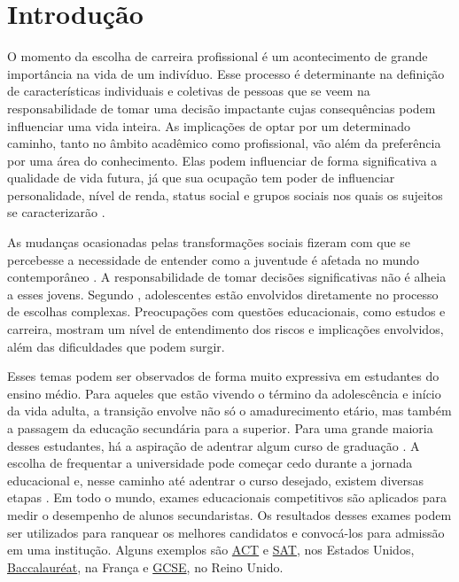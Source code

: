 \chapter{Introdução}

O momento da escolha de carreira profissional é um acontecimento de grande importância na vida de um indivíduo. Esse processo é determinante na definição de características individuais e coletivas de pessoas que se veem na responsabilidade de tomar uma decisão impactante \autocite{AkosahTwumasi2018} cujas consequências podem influenciar uma vida inteira. As implicações de optar por um determinado caminho, tanto no âmbito acadêmico como profissional, vão além da preferência por uma área do conhecimento. Elas podem influenciar de forma significativa a qualidade de vida futura, já que sua ocupação tem poder de influenciar personalidade, nível de renda, status social e grupos sociais nos quais os sujeitos se caracterizarão \autocite{Kazi2017}.

As mudanças ocasionadas pelas transformações sociais fizeram com que se percebesse a necessidade de entender como a juventude é afetada no mundo contemporâneo \autocite{Unesco2006}. A responsabilidade de tomar decisões significativas não é alheia a esses jovens. Segundo \citet{Gati2001}, adolescentes estão envolvidos diretamente no processo de escolhas complexas. Preocupações com questões educacionais, como estudos e carreira, mostram um nível de entendimento dos riscos e implicações envolvidos, além das dificuldades que podem surgir.

Esses temas podem ser observados de forma muito expressiva em estudantes do ensino médio. Para aqueles que estão vivendo o término da adolescência e início da vida adulta, a transição envolve não só o amadurecimento etário, mas também a passagem da educação secundária para a superior. Para uma grande maioria desses estudantes, há a aspiração de adentrar algum curso de graduação \autocite{Venezia2013}. A escolha de frequentar a universidade pode começar cedo durante a jornada educacional e, nesse caminho até adentrar o curso desejado, existem diversas etapas \autocite{Cabrera2000}. Em todo o mundo, exames educacionais competitivos são aplicados para medir o desempenho de alunos secundaristas. Os resultados desses exames podem ser utilizados para ranquear os melhores candidatos e convocá-los para admissão em uma institução. Alguns exemplos são \href{https://www.act.org/content/act/en/products-and-services/the-act.html}{ACT} e  \href{https://satsuite.collegeboard.org/sat}{SAT}, nos Estados Unidos, \href{https://www.education.gouv.fr/reussir-au-lycee/le-baccalaureat-general-10457}{Baccalauréat}, na França e \href{https://www.britishcouncil.es/en/exam/professional-university/igcse}{GCSE}, no Reino Unido.

